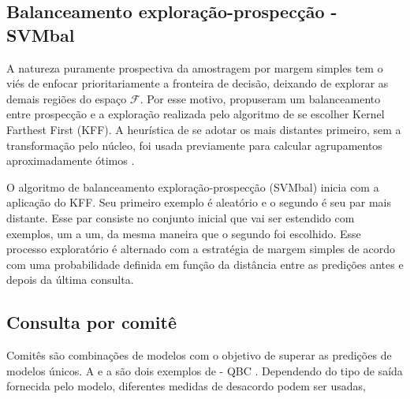 \subsection{Balanceamento exploração-prospecção - SVMbal}
A natureza puramente prospectiva da amostragem por margem simples tem o viés de enfocar
prioritariamente a fronteira de decisão, deixando de explorar as demais regiões do espaço
$\mathcal{F}$.
Por esse motivo, \cite{conf/icdm/OsugiKS05} propuseram um balanceamento entre prospecção
e a exploração realizada pelo algoritmo de se escolher 
{Kernel Farthest First} (KFF).
A heurística de se adotar os mais distantes primeiro, sem a transformação pelo núcleo,
foi usada previamente para calcular agrupamentos aproximadamente ótimos
\citep{Hochbaum1985}.

O algoritmo de balanceamento exploração-prospecção (SVMbal) inicia com a aplicação do KFF.
Seu primeiro exemplo é aleatório e o segundo é seu par mais distante.
Esse par consiste no conjunto inicial que vai ser estendido com exemplos,
um a um, da mesma maneira que o segundo foi escolhido.
Esse processo exploratório é alternado com a estratégia de margem simples
de acordo com uma probabilidade definida em função da distância entre as predições
antes e depois da última consulta.

\subsection{Consulta por comitê}\label{qbc}
Comitês
são combinações de modelos com o objetivo de superar as predições de modelos únicos.
A  e
a 
são dois exemplos de  - QBC
\citep{conf/icml/AbeM98}.
Dependendo do tipo de saída fornecida pelo modelo, diferentes medidas de desacordo
podem ser usadas,

